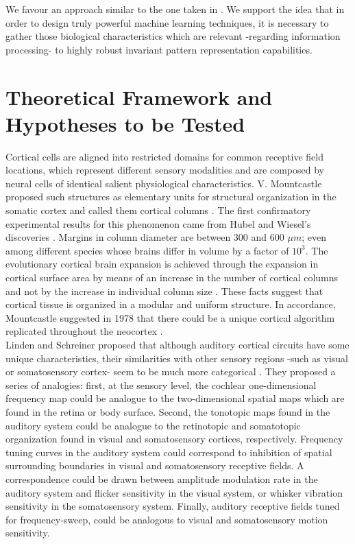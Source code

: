 \documentclass[11pt,a4paper]{article}
\begin{document}
We favour an approach similar to the one taken in \cite{hawkins_2016}.
We support the idea that in order to design truly powerful machine
learning techniques,
it is necessary to gather those biological characteristics which are
relevant -regarding information processing- to highly
robust invariant pattern representation capabilities. \\













\section{Theoretical Framework and Hypotheses to be Tested}

Cortical cells are aligned into restricted domains for common receptive field locations,
which represent different sensory modalities and are composed by neural cells of identical
salient physiological characteristics.
V. Mountcastle proposed such structures as elementary units for structural organization
in the somatic cortex and called them cortical columns \cite{mountcastle_1955, mountcastle_1957}.
The first confirmatory experimental results for this phenomenon came from Hubel and Wiesel’s
discoveries \cite{hubel_1962, hubel_1968}.
Margins in column diameter are between 300 and 600 $\mu m$; even
among different species whose brains differ in volume by a factor of $10^3$.
The evolutionary cortical brain expansion is achieved through the expansion in
cortical surface area by means of an increase in the number of cortical columns
and not by the increase in individual column size \cite{rakic_1995}.
These facts suggest that cortical tissue is organized in a modular and uniform structure.
In accordance, Mountcastle suggested in 1978 that there could be
a unique cortical algorithm replicated throughout the neocortex
\cite{mountcastle_1978}.\\

Linden and Schreiner proposed that although auditory
cortical circuits have some unique characteristics,
their similarities with other sensory regions -such as visual or somatosensory cortex-
seem to be much more categorical \cite{linden_2003}.
They proposed a series of analogies:
first, at the sensory level, the cochlear one-dimensional frequency map
could be analogue to the two-dimensional spatial maps which are found
in the retina or body surface.
Second, the tonotopic maps found in the auditory system could be analogue to the
retinotopic and somatotopic organization found in visual and somatosensory cortices,
respectively.
Frequency tuning curves in the auditory system could correspond to inhibition of
spatial surrounding boundaries in visual and somatosensory receptive fields.
A correspondence could be drawn between amplitude modulation rate
in the auditory system and flicker sensitivity in the visual system, or
whisker vibration sensitivity in the somatosensory system.
Finally, auditory receptive fields tuned for frequency-sweep, could be
analogous to visual and somatosensory motion sensitivity.\\
\end{document}
